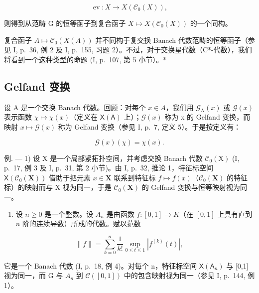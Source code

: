 \[
\operatorname{ev} \colon X \to X (\mathscr {C} _ {0} (X)),
\]

则得到从范畴 G 的恒等函子到复合函子 \(X \mapsto X(\mathcal{C}_{0}(X))\) 的一个同构。

复合函子 \(A \mapsto \mathcal{C}_{0}(X(A))\) 并不同构于复交换 Banach 代数范畴的恒等函子（参见 I, p.~36, 例 2 及 I, p.~155, 习题 2）。不过，对于交换星代数（C*-代数），我们将看到一个这种类型的命题 (I, p.~107, 第 5 小节）。*

\subsection{Gelfand 变换}

设 A 是一个交换 Banach 代数。回顾：对每个 \(x \in A\)，我们用 \(\mathcal{G}_{\mathrm{A}}(x)\) 或 \(\mathcal{G}(x)\) 表示函数 \(\chi \mapsto \chi(x)\)（定义在 \(\mathsf{X}(\mathsf{A})\) 上）；\(\mathcal{G}(x)\) 称为 x 的 Gelfand 变换，而映射 \(x \mapsto \mathcal{G}(x)\) 称为 Gelfand 变换（参见 I, p.~7, 定义 5）。于是按定义有：

\[
\mathcal {G} (x) (\chi) = \chi (x).
\]

例. --- 1) 设 X 是一个局部紧拓扑空间，并考虑交换 Banach 代数 \(\mathcal{C}_{0}(\mathrm{X})\) (I, p.~17, 例 3 及 I, p.~31, 第 2 小节)。由 I, p.~32, 推论 1，特征标空间 \(\mathsf{X}(\mathcal{C}_{0}(\mathbf{X}))\) 借助于把元素 \(x \in \mathbf{X}\) 联系到特征标 \(f \mapsto f(x)\)（\(\mathcal{C}_{0}(\mathbf{X})\) 的特征标）的映射而与 X 视为同一，于是 \(\mathcal{C}_{0}(\mathbf{X})\) 的 Gelfand 变换与恒等映射视为同一。

\begin{enumerate}
\def\labelenumi{\arabic{enumi})}
\setcounter{enumi}{1}
\tightlist
\item
  设 \(n \geqslant 0\) 是一个整数。设 \(A_n\) 是由函数 \(f: [0,1] \to K\)（在 \([0,1]\) 上具有直到 \(n\) 阶的连续导数）所成的代数。赋以范数
\end{enumerate}

\[
\| f \| = \sum_ {k = 0} ^ {n} \frac {1}{k !} \sup _ {0 \leqslant t \leqslant 1} | f ^ {(k)} (t) |,
\]

它是一个 Banach 代数 (I, p.~18, 例 4)。对每个 n，特征标空间 \(\mathsf{X}(\mathsf{A}_{n})\) 与 {[}0,1{]} 视为同一，而 G 与 \(A_{n}\) 到 \(\mathcal{C}([0,1])\) 中的包含映射视为同一（参见 I, p.~144, 例 1）。

